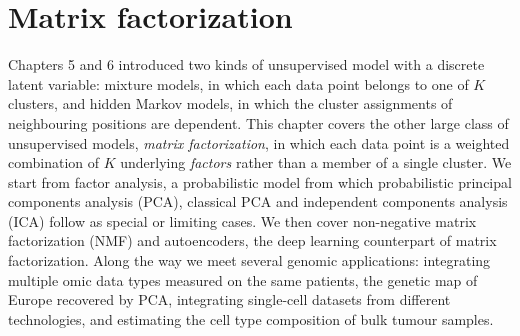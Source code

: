 
\providecommand{\R}{\mathbb{R}}
\providecommand{\E}{\mathbb{E}}
\providecommand{\Normal}{\mathcal{N}}
\providecommand{\argmax}{\operatorname*{arg\,max}}
\providecommand{\argmin}{\operatorname*{arg\,min}}
\providecommand{\vy}{\mathbf{y}}
\providecommand{\vx}{\mathbf{x}}
\providecommand{\mX}{\mathbf{X}}
\providecommand{\mI}{\mathbf{I}}
\providecommand{\vb}{\boldsymbol{\beta}}
\providecommand{\veps}{\boldsymbol{\epsilon}}
\providecommand{\vp}{\mathbf{p}}
\providecommand{\vg}{\mathbf{g}}
\providecommand{\ind}{\mathbf{1}}
\providecommand{\mY}{\mathbf{Y}}
\providecommand{\mW}{\mathbf{W}}
\providecommand{\mE}{\mathbf{E}}
\providecommand{\mS}{\mathbf{S}}
\providecommand{\mU}{\mathbf{U}}
\providecommand{\mV}{\mathbf{V}}
\providecommand{\mR}{\mathbf{R}}
\providecommand{\mA}{\mathbf{A}}
\providecommand{\mB}{\mathbf{B}}
\providecommand{\mC}{\mathbf{C}}
\providecommand{\mM}{\mathbf{M}}
\providecommand{\mG}{\mathbf{G}}
\providecommand{\mL}{\mathbf{L}}
\providecommand{\mD}{\mathbf{D}}
\providecommand{\mPsi}{\boldsymbol{\Psi}}
\providecommand{\mSigma}{\boldsymbol{\Sigma}}
\providecommand{\mLambda}{\boldsymbol{\Lambda}}
\providecommand{\vw}{\mathbf{w}}
\providecommand{\vu}{\mathbf{u}}
\providecommand{\vm}{\mathbf{m}}
\providecommand{\vz}{\mathbf{z}}
\providecommand{\vmu}{\boldsymbol{\mu}}
\providecommand{\vgamma}{\boldsymbol{\gamma}}
\providecommand{\vzero}{\mathbf{0}}
\providecommand{\tr}{\operatorname{tr}}
\providecommand{\diag}{\operatorname{diag}}
\providecommand{\Gam}{\operatorname{Gamma}}

\providecommand{\chaptertoc}{}
\chapter{Matrix factorization}
\label{ch:matfact}
\chaptertoc

Chapters 5 and 6 introduced two kinds of unsupervised model with a discrete latent variable: mixture models, in which each data point belongs to one of $K$ clusters, and hidden Markov models, in which the cluster assignments of neighbouring positions are dependent. This chapter covers the other large class of unsupervised models, \emph{matrix factorization}, in which each data point is a weighted combination of $K$ underlying \emph{factors} rather than a member of a single cluster. We start from factor analysis, a probabilistic model from which probabilistic principal components analysis (PCA), classical PCA and independent components analysis (ICA) follow as special or limiting cases. We then cover non-negative matrix factorization (NMF) and autoencoders, the deep learning counterpart of matrix factorization. Along the way we meet several genomic applications: integrating multiple omic data types measured on the same patients, the genetic map of Europe recovered by PCA, integrating single-cell datasets from different technologies, and estimating the cell type composition of bulk tumour samples.

